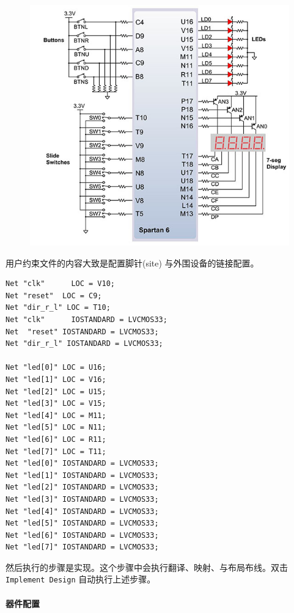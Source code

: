 \documentclass{ctexart}
\begin{document}
        \begin{figure}
\centering
\includegraphics[width=1\linewidth]{report-1-io-ports}
\caption{}
\label{fig:report-1-io-ports}
\end{figure}

        
        用户约束文件的内容大致是配置脚针(site) 与外围设备的链接配置。
\begin{lstlisting}
Net "clk"      LOC = V10;
Net "reset"  LOC = C9;
Net "dir_r_l" LOC = T10;
Net "clk"      IOSTANDARD = LVCMOS33;
Net  "reset" IOSTANDARD = LVCMOS33;
Net "dir_r_l" IOSTANDARD = LVCMOS33;

Net "led[0]" LOC = U16;
Net "led[1]" LOC = V16;
Net "led[2]" LOC = U15;
Net "led[3]" LOC = V15;
Net "led[4]" LOC = M11;
Net "led[5]" LOC = N11;
Net "led[6]" LOC = R11;
Net "led[7]" LOC = T11;
Net "led[0]" IOSTANDARD = LVCMOS33;
Net "led[1]" IOSTANDARD = LVCMOS33;
Net "led[2]" IOSTANDARD = LVCMOS33;
Net "led[3]" IOSTANDARD = LVCMOS33;
Net "led[4]" IOSTANDARD = LVCMOS33;
Net "led[5]" IOSTANDARD = LVCMOS33;
Net "led[6]" IOSTANDARD = LVCMOS33;
Net "led[7]" IOSTANDARD = LVCMOS33;
\end{lstlisting}
		
        然后执行的步骤是实现。这个步骤中会执行翻译、映射、与布局布线。双击
        \verb|Implement Design| 自动执行上述步骤。
		
        \paragraph{器件配置}
\end{document}
